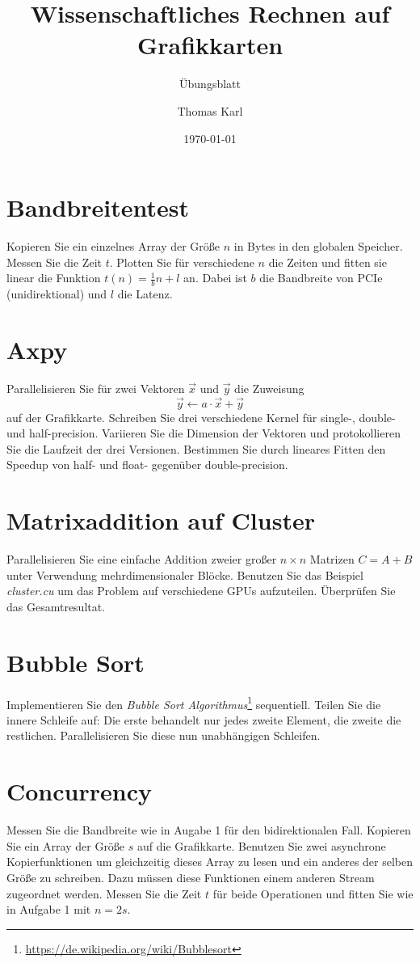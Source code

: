 \documentclass[headsepline=3pt,headinclude=true,12pt,oneside]{scrartcl}
\author{Thomas Karl}
\title{Wissenschaftliches Rechnen auf Grafikkarten}
\subtitle{Übungsblatt}
\date{\today}
\begin{document}
	\maketitle
	
	\tableofcontents
	
	\section{Bandbreitentest}
	Kopieren Sie ein einzelnes Array der Größe $n$ in Bytes in den globalen Speicher. Messen Sie die Zeit $t$. Plotten Sie für verschiedene $n$ die Zeiten und fitten sie linear die Funktion $t(n) = \frac1bn+l$ an. Dabei ist $b$ die Bandbreite von PCIe (unidirektional) und $l$ die Latenz.
	
	\section{Axpy}
	Parallelisieren Sie für zwei Vektoren $\vec{x}$ und $\vec{y}$ die Zuweisung
	\begin{equation}
		\vec{y} \leftarrow a\cdot\vec{x} + \vec{y} 
	\end{equation}
	auf der Grafikkarte. Schreiben Sie drei verschiedene Kernel für single-, double- und half-precision. Variieren Sie die Dimension der Vektoren und protokollieren Sie die Laufzeit der drei Versionen. Bestimmen Sie durch lineares Fitten den Speedup von half- und float- gegenüber double-precision.
	
	\section{Matrixaddition auf Cluster}
	Parallelisieren Sie eine einfache Addition zweier großer $n\times n$ Matrizen $C = A+B$ unter Verwendung mehrdimensionaler Blöcke. Benutzen Sie das Beispiel \textit{cluster.cu} um das Problem auf verschiedene GPUs aufzuteilen. Überprüfen Sie das Gesamtresultat.
	
	\section{Bubble Sort}
	Implementieren Sie den \textit{Bubble Sort Algorithmus}\footnote{\url{https://de.wikipedia.org/wiki/Bubblesort}} sequentiell. Teilen Sie die innere Schleife auf: Die erste behandelt nur jedes zweite Element, die zweite die restlichen. Parallelisieren Sie diese nun unabhängigen Schleifen.
	
	\section{Concurrency}
	Messen Sie die Bandbreite wie in Augabe 1 für den bidirektionalen Fall. Kopieren Sie ein Array der Größe $s$ auf die Grafikkarte. Benutzen Sie zwei asynchrone Kopierfunktionen um gleichzeitig dieses Array zu lesen und ein anderes der selben Größe zu schreiben. Dazu müssen diese Funktionen einem anderen Stream zugeordnet werden. Messen Sie die Zeit $t$ für beide Operationen und fitten Sie wie in Aufgabe 1 mit $n = 2s$.
	
\end{document}
